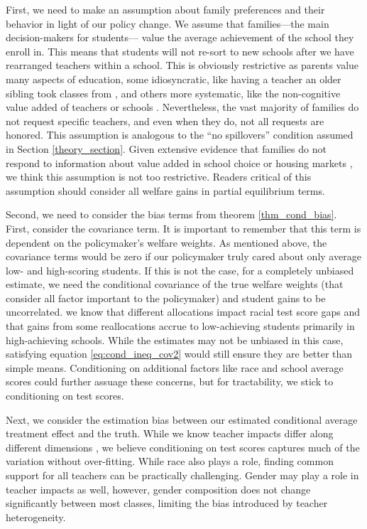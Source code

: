 \documentclass[12pt]{article}
\theoremstyle{definition}
\theoremstyle{definition}
\theoremstyle{definition}
\theoremstyle{definition}
\begin{document}
First, we need to make an assumption about family preferences and their behavior in light of our policy change. We assume that families---the main decision-makers for students--- value the average achievement of the school they enroll in. This means that students will not re-sort to new schools after we have rearranged teachers within a school. This is obviously restrictive as parents value many aspects of education, some idiosyncratic, like having a teacher an older sibling took classes from \citep[][]{}, and others more systematic, like the non-cognitive value added of teachers or schools \citep[][]{jackson2018test,pope2017multidimensional}. Nevertheless, the vast majority of families do not request specific teachers, and even when they do, not all requests are honored. %
This assumption is analogous to the ``no spillovers'' condition assumed in Section \ref{theory_section}. Given extensive evidence that families do not respond to information about value added in school choice \citep{abdulkadirouglu2020parents} or housing markets \citep{imberman2016does}, we think this assumption is not too restrictive. Readers critical of this assumption should consider all welfare gains in partial equilibrium terms.

Second, we need to consider the bias terms from theorem \ref{thm_cond_bias}. First, consider the covariance term. It is important to remember that this term is dependent on the policymaker's welfare weights. As mentioned above, the covariance terms would be zero if our policymaker truly cared about only average low- and high-scoring students. If this is not the case, for a completely unbiased estimate, we need the conditional covariance of the true welfare weights (that consider all factor important to the policymaker) and student gains to be uncorrelated. we know that different allocations impact racial test score gaps and that gains from some reallocations accrue to low-achieving students primarily in high-achieving schools. While the estimates may not be unbiased in this case, satisfying equation \ref{eq:cond_ineq_cov2} would still ensure they are better than simple means. Conditioning on additional factors like race and school average scores could further assuage these concerns, but for tractability, we stick to conditioning on test scores. 

Next, we consider the estimation bias between our estimated conditional average treatment effect and the truth. While we know teacher impacts differ along different dimensions \citep{Delgado2020}, we believe conditioning on test scores captures much of the variation without over-fitting. While race also plays a role, finding common support for all teachers can be practically challenging. Gender may play a role in teacher impacts as well, however, gender composition does not change significantly between most classes, limiting the bias introduced by teacher heterogeneity. 
\end{document}
